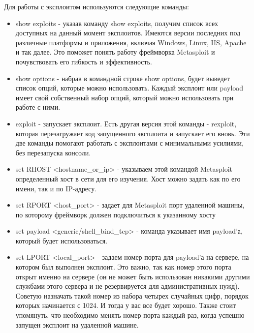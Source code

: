 \documentclass[11pt, a4paper]{article}		%
\begin{document}
Для работы с эксплоитом используются следующие команды:

\begin{itemize}

\item show exploits - указав команду show exploits, получим список всех доступных на данный момент эксплоитов. Имеются версии последних под различные платформы и приложения, включая Windows, Linux, IIS, Apache и так далее. Это поможет понять работу фреймворка Metasploit и почувствовать его гибкость и эффективность.

\item show options - набрав в командной строке show options, будет выведет список опций, которые можно использовать. Каждый эксплоит или payload имеет свой собственный набор опций, который можно использовать при работе с ними.

\item exploit - запускает эксплоит. Есть другая версия этой команды - rexploit, которая перезагружает код запущенного эксплоита и запускает его вновь. Эти две команды помогают работать с эксплоитами с минимальными усилиями, без перезапуска консоли.

\item set RHOST <hostname\_or\_ip> - указываем этой командой Metasploit определенный хост в сети для его изучения. Хост можно задать как по его имени, так и по IP-адресу.

\item set RPORT <host\_port> - задает для Metasploit порт удаленной машины, по которому фреймворк должен подключиться к указанному хосту

\item set payload <generic/shell\_bind\_tcp> - команда указывает имя payload’а, который будет использоваться.

\item  set LPORT <local\_port> - задаем номер порта для payload’а на сервере, на котором был выполнен эксплоит. Это важно, так как номер этого порта открыт именно на сервере (он не может быть использован никакими другими службами этого сервера и не резервируется для административных нужд). Советую назначать такой номер из набора четырех случайных цифр, порядок которых начинается с 1024. И тогда у вас все будет хорошо. Также стоит упомянуть, что необходимо менять номер порта каждый раз, когда успешно запущен эксплоит на удаленной машине.

\end{itemize}
\end{document}

